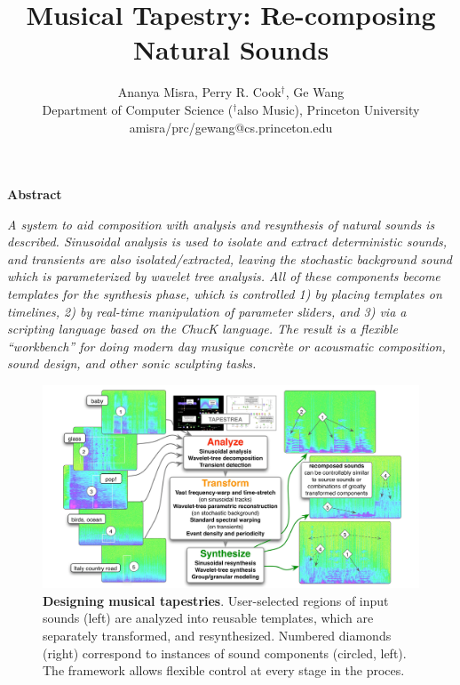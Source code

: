 \documentclass[10pt,letterpaper]{article}
\begin{document}
\twocolumn

\title{\textbf{Musical Tapestry: Re-composing Natural Sounds}}
\author{
Ananya Misra, Perry R. Cook$^{\dag}$, Ge Wang\\
Department of Computer Science ($^{\dag}$also Music), Princeton University \\
amisra/prc/gewang@cs.princeton.edu\\
}
\date{}     %
\maketitle

\pagestyle{empty}          %
\thispagestyle{empty}      %


\begin{center}
\large{\textbf{Abstract}}
\end{center}
\hspace*{-0.1in}                       %
\noindent
\textit{
A system to aid composition with analysis and resynthesis 
of natural sounds is described.  Sinusoidal analysis is 
used to isolate and extract deterministic sounds, and 
transients are also isolated/extracted, leaving the 
stochastic background sound which is parameterized 
by wavelet tree analysis.   All of these components 
become templates for the synthesis phase, which is 
controlled 1) by placing templates on timelines,
2) by real-time manipulation of parameter sliders,
and 3) via a scripting language based on the ChucK
language.  The result is a flexible ``workbench''
for doing modern day musique concr\`{e}te or acousmatic
composition, sound design, and other sonic sculpting
tasks.
}

\begin{figure}[tbh!]
\centering
    \includegraphics[width=.95\textwidth]{teaser.pdf}
    \caption{\textbf{Designing musical tapestries}.  User-selected regions of input sounds (left) are 
    analyzed into reusable templates, which are separately transformed, and resynthesized.
    Numbered diamonds (right) correspond to instances of sound components (circled, left).
    The framework allows flexible control at every stage in the proces.} 
    \label{fig:teaser}
\end{figure}
\end{document}
